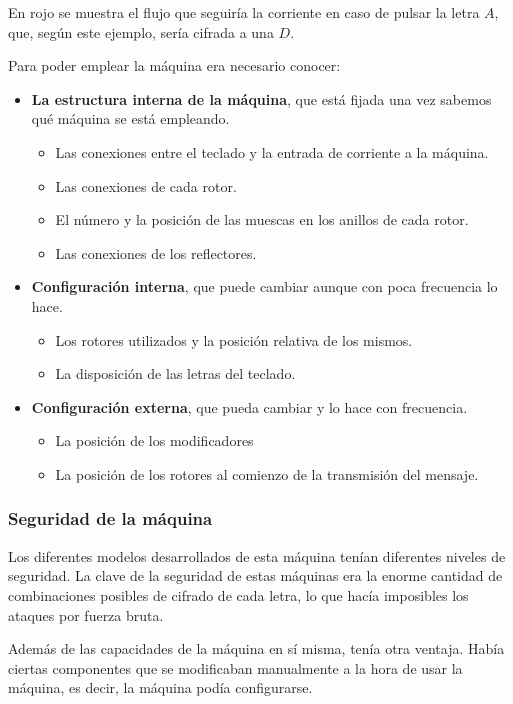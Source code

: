 \documentclass[nochap]{apuntesURJC}
\begin{document}
\vspace{1cm}

En rojo se muestra el flujo que seguiría la corriente en caso de pulsar la letra $A$, que, según este ejemplo, sería cifrada a una $D$.

Para poder emplear la máquina era necesario conocer:
\begin{itemize}
\item \textbf{La estructura interna de la máquina}, que está fijada una vez sabemos qué máquina se está empleando.
\begin{itemize}
\item Las conexiones entre el teclado y la entrada de corriente a la máquina.
\item Las conexiones de cada rotor.
\item El número y la posición de las muescas en los anillos de cada rotor.
\item Las conexiones de los reflectores.
\end{itemize}

\item \textbf{Configuración interna}, que puede cambiar aunque con poca frecuencia lo hace.
\begin{itemize}
\item Los rotores utilizados y la posición relativa de los mismos.
\item La disposición de las letras del teclado.
\end{itemize}
\item \textbf{Configuración externa}, que pueda cambiar y lo hace con frecuencia.
\begin{itemize}
\item La posición de los modificadores
\item La posición de los rotores al comienzo de la transmisión del mensaje.
\end{itemize}
\end{itemize}


\subsubsection{Seguridad de la máquina}
Los diferentes modelos desarrollados de esta máquina tenían diferentes niveles de seguridad. La clave de la seguridad de estas máquinas era la enorme cantidad de combinaciones posibles de cifrado de cada letra, lo que hacía imposibles los ataques por fuerza bruta.

Además de las capacidades de la máquina en sí misma, tenía otra ventaja. Había ciertas componentes que se modificaban manualmente a la hora de usar la máquina, es decir, la máquina podía configurarse.
\end{document}
